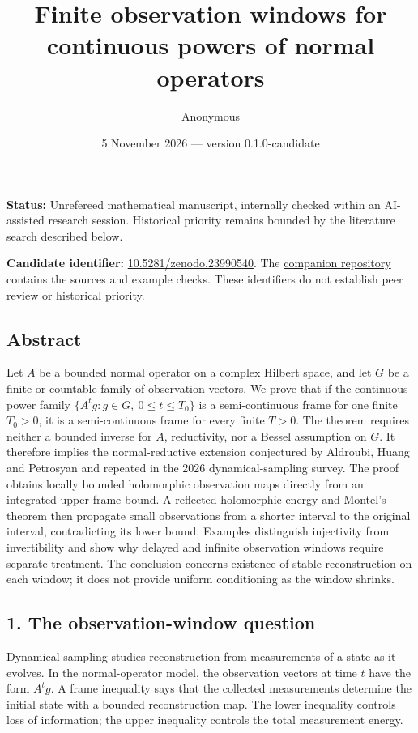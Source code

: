 \documentclass[
  11pt,
]{article}
\title{Finite observation windows for continuous powers of normal
operators}
\author{Anonymous}
\date{5 November 2026 --- version 0.1.0-candidate}
\begin{document}
\maketitle

\textbf{Status:} Unrefereed mathematical manuscript, internally checked
within an AI-assisted research session. Historical priority remains
bounded by the literature search described below.

\textbf{Candidate identifier:}
\href{https://doi.org/10.5281/zenodo.23990540}{10.5281/zenodo.23990540}.
The
\href{https://github.com/ipitchford/finite-normal-observation-windows}{companion
repository} contains the sources and example checks. These identifiers
do not establish peer review or historical priority.

\subsection{Abstract}\label{abstract}

Let \(A\) be a bounded normal operator on a complex Hilbert space, and
let \(G\) be a finite or countable family of observation vectors. We
prove that if the continuous-power family
\(\{A^t g:g\in G,\ 0\leq t\leq T_0\}\) is a semi-continuous frame for
one finite \(T_0>0\), it is a semi-continuous frame for every finite
\(T>0\). The theorem requires neither a bounded inverse for \(A\),
reductivity, nor a Bessel assumption on \(G\). It therefore implies the
normal-reductive extension conjectured by Aldroubi, Huang and Petrosyan
and repeated in the 2026 dynamical-sampling survey. The proof obtains
locally bounded holomorphic observation maps directly from an integrated
upper frame bound. A reflected holomorphic energy and Montel's theorem
then propagate small observations from a shorter interval to the
original interval, contradicting its lower bound. Examples distinguish
injectivity from invertibility and show why delayed and infinite
observation windows require separate treatment. The conclusion concerns
existence of stable reconstruction on each window; it does not provide
uniform conditioning as the window shrinks.

\subsection{1. The observation-window
question}\label{the-observation-window-question}

Dynamical sampling studies reconstruction from measurements of a state
as it evolves. In the normal-operator model, the observation vectors at
time \(t\) have the form \(A^t g\). A frame inequality says that the
collected measurements determine the initial state with a bounded
reconstruction map. The lower inequality controls loss of information;
the upper inequality controls the total measurement energy.
\end{document}
